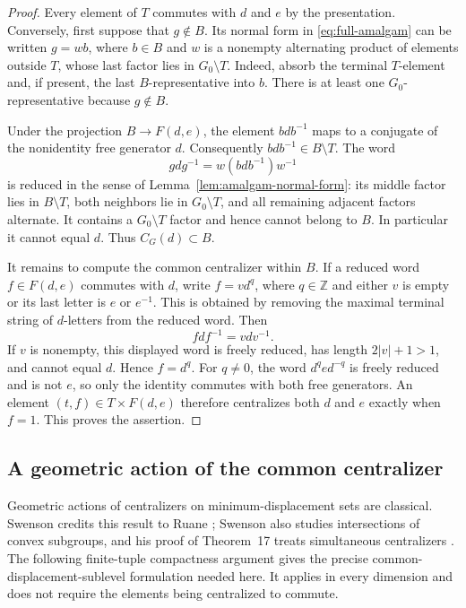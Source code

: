\begin{proof}
Every element of $T$ commutes with $d$ and $e$ by the presentation.
Conversely, first suppose that $g\notin B$.  Its normal form in
\eqref{eq:full-amalgam} can be written $g=wb$, where $b\in B$ and
$w$ is a nonempty alternating product of elements outside $T$,
whose last factor lies in $G_0\setminus T$.  Indeed, absorb the
terminal $T$-element and, if present, the last $B$-representative
into $b$.  There is at least one $G_0$-representative because
$g\notin B$.

Under the projection $B\to F(d,e)$, the element $bdb^{-1}$ maps
to a conjugate of the nonidentity free generator $d$.  Consequently
$bdb^{-1}\in B\setminus T$.  The word
\[
 gdg^{-1}=w(bdb^{-1})w^{-1}
\]
is reduced in the sense of Lemma~\ref{lem:amalgam-normal-form}:
its middle factor lies in $B\setminus T$, both neighbors lie in
$G_0\setminus T$, and all remaining adjacent factors alternate.
It contains a $G_0\setminus T$ factor and hence cannot belong to
$B$.  In particular it cannot equal $d$.  Thus $C_G(d)\subset B$.

It remains to compute the common centralizer within $B$.
If a reduced word $f\in F(d,e)$ commutes with $d$, write
$f=v d^q$, where $q\in\mathbb Z$ and either $v$ is empty or its
last letter is $e$ or $e^{-1}$.  This is obtained by removing the
maximal terminal string of $d$-letters from the reduced word.
Then
\[
 fdf^{-1}=v d v^{-1}.
\]
If $v$ is nonempty, this displayed word is freely reduced, has
length $2|v|+1>1$, and cannot equal $d$.  Hence $f=d^q$.
For $q\ne0$, the word $d^q e d^{-q}$ is freely reduced and is
not $e$, so only the identity commutes with both free generators.
An element $(t,f)\in T\times F(d,e)$ therefore centralizes both
$d$ and $e$ exactly when $f=1$.  This proves the assertion.
\end{proof}

\subsection{A geometric action of the common centralizer}

Geometric actions of centralizers on minimum-displacement sets are
classical.  Swenson \cite[Theorem~13]{Swenson1999} credits this result
to Ruane \cite{Ruane2001}; Swenson also studies intersections of convex
subgroups, and his proof of Theorem~17 treats simultaneous centralizers
\cite[Theorems~16--17]{Swenson1999}.  The following finite-tuple
compactness argument gives the precise common-displacement-sublevel
formulation needed here.  It applies in every dimension and does not
require the elements being centralized to commute.

